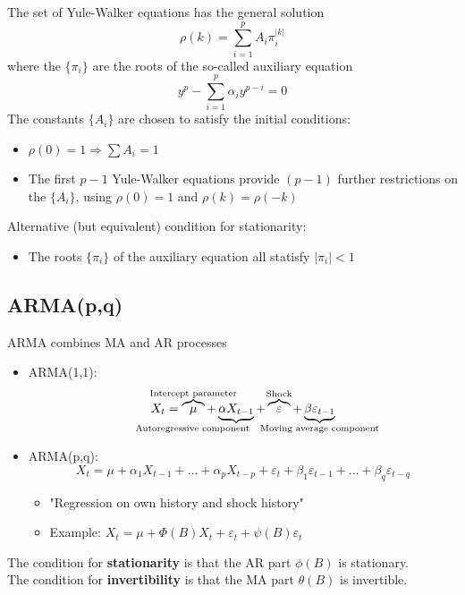 The set of Yule-Walker equations has the general solution \[
\rho(k) = \sum_{i=1}^p A_i\pi_i^{|k|}
\]
where the $\{\pi_i\}$ are the roots of the so-called auxiliary equation \[
y^p - \sum_{i=1}^p \alpha_i y^{p-i}=0
\]
The constants $\{A_i\}$ are chosen to satisfy the initial conditions:
\begin{itemize}
    \item $\rho(0)=1 \Rightarrow \sum A_i = 1 $
    \item The first ${p-1}$ Yule-Walker equations provide $(p-1)$ further restrictions on the $\{A_i\}$, using $\rho(0)=1$ and $\rho(k)=\rho(-k)$
\end{itemize}
Alternative (but equivalent) condition for stationarity:
\begin{itemize}
    \item The roots $\{\pi_i\}$ of the auxiliary equation all statisfy $|\pi_i|<1$
\end{itemize}


\subsection{ARMA(p,q)}

ARMA combines MA and AR processes

\begin{itemize}
    \item ARMA(1,1): \[
    X_t = \overbrace{\mu}^{\mathclap{\text{Intercept parameter}}} + 
    \underbrace{\alpha X_{t-1}}_{\mathclap{\text{Autoregressive component}\phantom{ \quad \quad \quad \quad\quad \quad \quad}}} + 
    \overbrace{\varepsilon}^{\mathclap{\text{Shock}}} + 
    \underbrace{\beta \varepsilon_{t-1}}_{\mathclap{\text{Moving average component}}}
    \]
    \item ARMA(p,q): \[
    X_t=\mu+\alpha_1 X_{t-1} +...+\alpha_p X_{t-p}+ \varepsilon_t + \beta_1 \varepsilon_{t-1}+...+ \beta_q \varepsilon_{t-q}
    \]
    \begin{itemize}
        \item[] "Regression on own history and shock history"
        \item[] Example: \(X_t=\mu+\Phi(B)X_t+\varepsilon_t+\psi(B)\varepsilon_t \)
    \end{itemize}
\end{itemize}

The condition for \textbf{stationarity} is that the AR part $\phi(B)$ is stationary.\\
The condition for \textbf{invertibility} is that the MA part $\theta(B)$ is invertible.

